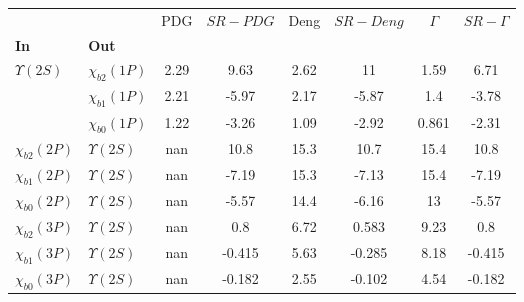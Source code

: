 \begin{tabular}{l|l|c|c|c|c|c|c}
\toprule
                &                &  PDG & $SR-PDG$ &  Deng & $SR-Deng$ &  $\Gamma$ & $SR-\Gamma$ \\
\textbf{In} & \textbf{Out} &      &          &       &           &           &             \\
\midrule
\textbf{$\Upsilon(2S)$} & \textbf{$\chi_{b2}(1P)$} & 2.29 &     9.63 &  2.62 &        11 &      1.59 &        6.71 \\
                & \textbf{$\chi_{b1}(1P)$} & 2.21 &    -5.97 &  2.17 &     -5.87 &       1.4 &       -3.78 \\
                & \textbf{$\chi_{b0}(1P)$} & 1.22 &    -3.26 &  1.09 &     -2.92 &     0.861 &       -2.31 \\
\textbf{$\chi_{b2}(2P)$} & \textbf{$\Upsilon(2S)$} &  nan &     10.8 &  15.3 &      10.7 &      15.4 &        10.8 \\
\textbf{$\chi_{b1}(2P)$} & \textbf{$\Upsilon(2S)$} &  nan &    -7.19 &  15.3 &     -7.13 &      15.4 &       -7.19 \\
\textbf{$\chi_{b0}(2P)$} & \textbf{$\Upsilon(2S)$} &  nan &    -5.57 &  14.4 &     -6.16 &        13 &       -5.57 \\
\textbf{$\chi_{b2}(3P)$} & \textbf{$\Upsilon(2S)$} &  nan &      0.8 &  6.72 &     0.583 &      9.23 &         0.8 \\
\textbf{$\chi_{b1}(3P)$} & \textbf{$\Upsilon(2S)$} &  nan &   -0.415 &  5.63 &    -0.285 &      8.18 &      -0.415 \\
\textbf{$\chi_{b0}(3P)$} & \textbf{$\Upsilon(2S)$} &  nan &   -0.182 &  2.55 &    -0.102 &      4.54 &      -0.182 \\
\bottomrule
\end{tabular}
